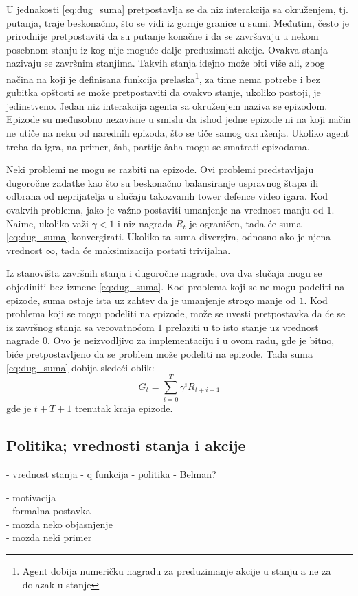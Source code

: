 U jednakosti \eqref{eq:dug_suma} pretpostavlja se da niz interakcija sa okruženjem, tj. putanja, traje beskonačno, što se vidi iz gornje granice u sumi. Međutim, često je prirodnije pretpostaviti da su putanje konačne i da se završavaju u nekom posebnom stanju iz kog nije moguće dalje preduzimati akcije. Ovakva stanja nazivaju se završnim stanjima. Takvih stanja idejno može biti više ali, zbog načina na koji je definisana funkcija prelaska\footnote{Agent dobija numeričku nagradu za preduzimanje akcije u stanju a ne za dolazak u stanje}, za time nema potrebe i bez gubitka opštosti se može pretpostaviti da ovakvo stanje, ukoliko postoji, je jedinstveno. Jedan niz interakcija agenta sa okruženjem naziva se epizodom. Epizode su međusobno nezavisne u smislu da ishod jedne epizode ni na koji način ne utiče na neku od narednih epizoda, što se tiče samog okruženja. Ukoliko agent treba da igra, na primer, šah, partije šaha mogu se smatrati epizodama. 
\par 
Neki problemi ne mogu se razbiti na epizode. Ovi problemi predstavljaju dugoročne zadatke kao što su beskonačno balansiranje uspravnog štapa ili odbrana od neprijatelja u slučaju takozvanih tower defence video igara. Kod ovakvih problema, jako je važno postaviti umanjenje na vrednost manju od $1$. Naime, ukoliko važi $\gamma < 1$ i niz nagrada $R_t$ je ograničen, tada će suma \eqref{eq:dug_suma} konvergirati. Ukoliko ta suma divergira, odnosno ako je njena vrednost $\infty$, tada će maksimizacija postati trivijalna.
\par 
Iz stanovišta završnih stanja i dugoročne nagrade, ova dva slučaja mogu se objediniti bez izmene \eqref{eq:dug_suma}. Kod problema koji se ne mogu podeliti na epizode, suma ostaje ista uz zahtev da je umanjenje strogo manje od $1$. Kod problema koji se mogu podeliti na epizode, može se uvesti pretpostavka da će se iz završnog stanja sa verovatnoćom $1$ prelaziti u to isto stanje uz vrednost nagrade $0$. Ovo je neizvodljivo za implementaciju i u ovom radu, gde je bitno, biće pretpostavljeno da se problem može podeliti na epizode. Tada suma \eqref{eq:dug_suma} dobija sledeći oblik:
\begin{equation}
	G_t = \sum_{i=0}^{T} \gamma^iR_{t+i+1}
\end{equation}
gde je $t+T+1$ trenutak kraja epizode. 

\subsection{Politika; vrednosti stanja i akcije}



- vrednost stanja
- q funkcija
- politika
- Belman?


- motivacija \\
- formalna postavka \\
- mozda neko objasnjenje \\
- mozda neki primer \\